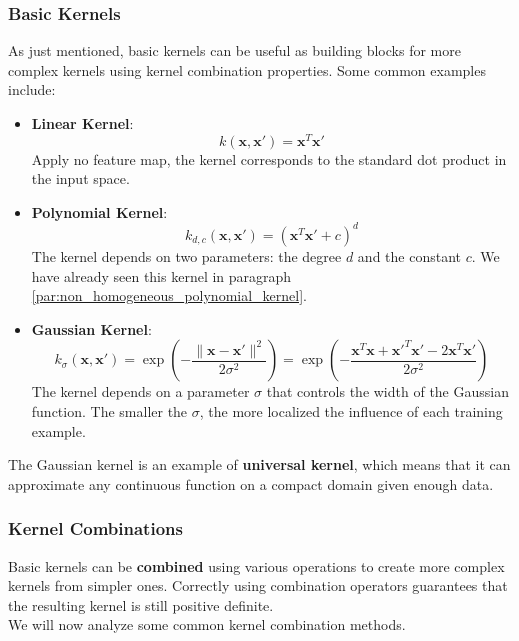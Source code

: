\subsubsection{Basic Kernels}
As just mentioned, basic kernels can be useful as building blocks for more complex kernels using kernel combination properties. 
Some common examples include:
\begin{itemize}
    \item \textbf{Linear Kernel}:
    \begin{equation}
        k(\boldsymbol{x}, \boldsymbol{x}') = \boldsymbol{x}^T \boldsymbol{x}'
    \end{equation}
    Apply no feature map, the kernel corresponds to the standard dot product in the input space.
    \item \textbf{Polynomial Kernel}:
    \begin{equation}
        k_{d,c}(\boldsymbol{x}, \boldsymbol{x}') = (\boldsymbol{x}^T \boldsymbol{x}' + c)^d
    \end{equation}
    The kernel depends on two parameters: the degree $d$ and the constant $c$. We have already seen this kernel
    in paragraph \ref{par:non_homogeneous_polynomial_kernel}.
    \item \textbf{Gaussian Kernel}:
    \begin{equation}
        k_\sigma(\boldsymbol{x}, \boldsymbol{x}') = \exp\left(-\frac{\|\boldsymbol{x} - \boldsymbol{x}'\|^2}{2\sigma^2}\right)
        = \exp\left(-\frac{\boldsymbol{x}^T \boldsymbol{x} + \boldsymbol{x}'^T \boldsymbol{x}' - 2 \boldsymbol{x}^T \boldsymbol{x}'}{2\sigma^2}\right) 
    \end{equation}
    The kernel depends on a parameter $\sigma$ that controls the width of the Gaussian function. The smaller the $\sigma$, the more localized the influence of each training example.
\end{itemize}
The Gaussian kernel is an example of \textbf{universal kernel}, which means that it can approximate any continuous function on a compact domain given enough data.
\subsubsection{Kernel Combinations}
Basic kernels can be \textbf{combined} using various operations to create more complex kernels from simpler ones. 
Correctly using combination operators guarantees that the resulting kernel is still positive definite.
\\We will now analyze some common kernel combination methods.

